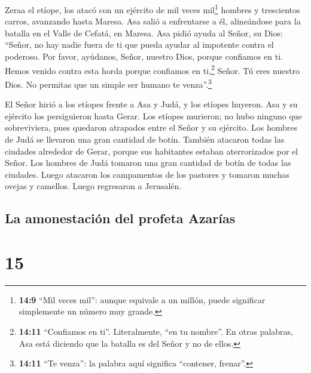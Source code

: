  Zeraa el etíope, los atacó con un ejército de mil veces
mil\footnote{\textbf{14:9} ``Mil veces mil'': aunque equivale a un
  millón, puede significar simplemente un número muy grande.} hombres y
trescientos carros, avanzando hasta Maresa.  Asa salió a
enfrentarse a él, alineándose para la batalla en el Valle de Cefatá, en
Maresa.  Asa pidió ayuda al Señor, su Dios: ``Señor, no
hay nadie fuera de ti que pueda ayudar al impotente contra el poderoso.
Por favor, ayúdanos, Señor, nuestro Dios, porque confiamos en ti. Hemos
venido contra esta horda porque confiamos en ti,\footnote{\textbf{14:11}
  ``Confiamos en ti''. Literalmente, ``en tu nombre''. En otras
  palabras, Asa está diciendo que la batalla es del Señor y no de ellos.}
Señor. Tú eres nuestro Dios. No permitas que un simple ser humano te
venza''.\footnote{\textbf{14:11} ``Te venza'': la palabra aquí significa
  ``contener, frenar''.}

 El Señor hirió a los etíopes frente a Asa y Judá, y los
etíopes huyeron.  Asa y su ejército los persiguieron
hasta Gerar. Los etíopes murieron; no hubo ninguno que sobreviviera,
pues quedaron atrapados entre el Señor y su ejército. Los hombres de
Judá se llevaron una gran cantidad de botín.  También
atacaron todas las ciudades alrededor de Gerar, porque sus habitantes
estaban aterrorizados por el Señor. Los hombres de Judá tomaron una gran
cantidad de botín de todas las ciudades.  Luego atacaron
los campamentos de los pastores y tomaron muchas ovejas y camellos.
Luego regresaron a Jerusalén.

\hypertarget{la-amonestaciuxf3n-del-profeta-azaruxedas}{%
\subsection{La amonestación del profeta
Azarías}\label{la-amonestaciuxf3n-del-profeta-azaruxedas}}

\hypertarget{section-14}{%
\section{15}\label{section-14}}

